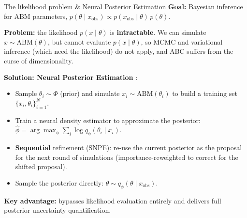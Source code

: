\documentclass[9pt]{beamer}
\begin{document}
\begin{frame}{The likelihood problem \& Neural Posterior Estimation}
\label{SBI-motivation}
    \small
    \textbf{Goal:} Bayesian inference for ABM parameters, $p(\theta \mid x_{\text{obs}}) \propto p(x_{\text{obs}}\mid\theta)\,p(\theta)$.

    \textbf{Problem:} the likelihood $p(x\mid\theta)$ is \textbf{intractable}. We can simulate $x \sim \text{ABM}(\theta)$, but cannot evaluate $p(x\mid\theta)$, so MCMC and variational inference (which need the likelihood) do not apply, and ABC suffers from the curse of dimensionality.

    \textbf{Solution: Neural Posterior Estimation} \citep{dyer_black-box_2024}:
    \begin{itemize}\setlength\itemsep{0.2em}
        \item Sample $\theta_i \sim \Phi$ (prior) and simulate $x_i \sim \text{ABM}(\theta_i)$ to build a training set $\{x_i,\theta_i\}_{i=1}^{N}$.
        \item Train a neural density estimator to approximate the posterior: $\hat{\phi} = \arg\max_\phi \sum_{i} \log q_\phi(\theta_i\mid x_i)$.
        \item \textbf{Sequential} refinement (SNPE): re-use the current posterior as the proposal for the next round of simulations (importance-reweighted to correct for the shifted proposal).
        \item Sample the posterior directly: $\theta \sim q_{\hat{\phi}}(\theta\mid x_{\text{obs}})$.
    \end{itemize}
    \textbf{Key advantage:} bypasses likelihood evaluation entirely and delivers full posterior uncertainty quantification.
\end{frame}
\end{document}
